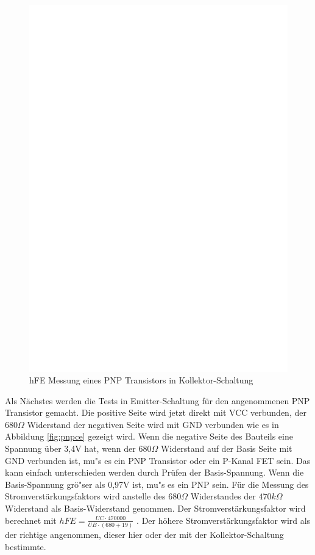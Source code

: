 \begin{figure}[H]
\centering
\includegraphics[]{../FIG/PNPcc.eps}
\caption{hFE Messung eines PNP Transistors in Kollektor-Schaltung}
\label{fig:pnpcc}
\end{figure}

Als N\"achstes werden die Tests in Emitter-Schaltung f\"ur den angenommenen PNP Transistor gemacht.
Die positive Seite wird jetzt direkt mit VCC verbunden, der \(680\Omega\) Widerstand der negativen Seite wird 
mit GND verbunden wie es in Abbildung \ref{fig:pnpce} gezeigt wird. 
Wenn die negative Seite des Bauteils eine Spannung \"uber 3,4V hat, wenn der \(680\Omega\) Widerstand auf der Basis Seite mit
GND verbunden ist, mu"s es ein PNP Transistor oder ein P-Kanal FET sein.
Das kann einfach unterschieden werden durch Pr\"ufen der Basis-Spannung.
Wenn die Basis-Spannung gr\"o"ser als 0,97V ist, mu"s es ein PNP sein.
F\"ur die Messung des Stromverst\"arkungsfaktors wird anstelle des \(680\Omega\) Widerstandes der
 \(470k\Omega\) Widerstand als Basis-Widerstand genommen.
Der Stromverst\"arkungsfaktor wird berechnet mit \(hFE = \frac{UC \cdot 470000}{UB \cdot (680+19)}\) .
Der h\"ohere Stromverst\"arkungsfaktor wird als der richtige angenommen, dieser hier oder der
mit der Kollektor-Schaltung bestimmte.

